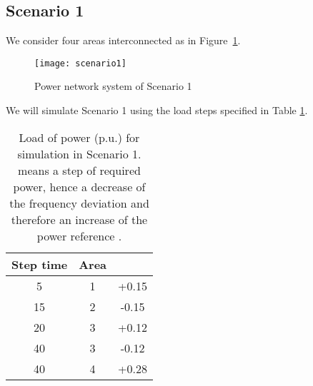 \documentclass[a4paper]{article}
\begin{document}
          \subsection{Scenario 1}
               \label{sec:scenario1}
               We consider four areas interconnected as in Figure~\ref{fig:scenario1}.
               \begin{figure}[!ht]
                 \centering
                 \texttt{[image: scenario1]}
                 \caption{Power network system of Scenario 1}
                 \label{fig:scenario1}
               \end{figure}
               We will simulate Scenario 1 using the load steps specified in Table \ref{tab:simulationscen1}.
               \begin{table}[!ht]
                 \centering
                 \begin{tabular}{|c|c|c|}
                   \hline
                   Step time  &  Area  &  \\
                   \hline
                   5               &      1        &   +0.15             \\
                   \hline
                   15             &      2        &   -0.15             \\
                   \hline
                   20             &      3        &   +0.12             \\
                   \hline
                   40             &      3        &   -0.12             \\
                   \hline
                   40             &      4        &   +0.28            \\
                   \hline
                 \end{tabular}
                 \caption{Load of power  (p.u.) for simulation in Scenario 1.  means a step of required power, hence a decrease of the frequency deviation  and therefore an increase of the power reference .}
                 \label{tab:simulationscen1}
               \end{table}
\end{document}
